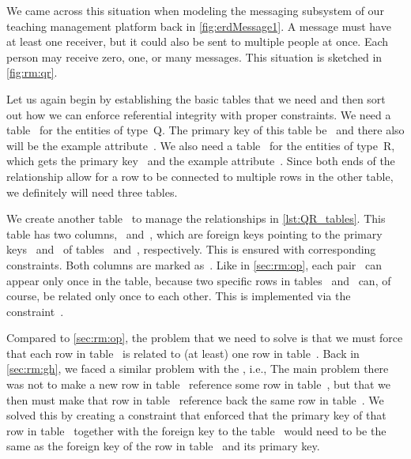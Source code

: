 We came across this situation when modeling the messaging subsystem of our teaching management platform back in \cref{fig:erdMessage1}.
A message must have at least one receiver, but it could also be sent to multiple people at once.
Each person may receive zero, one, or many messages.
This situation is sketched in \cref{fig:rm:qr}.

Let us again begin by establishing the basic tables that we need and then sort out how we can enforce referential integrity with proper constraints.
We need a table~ for the entities of type~Q.
The primary key of this table be~ and there also will be the example attribute~.
We also need a table~ for the entities of type~R, which gets the primary key~ and the example attribute~.
Since both ends of the relationship allow for a row to be connected to multiple rows in the other table, we definitely will need three tables.

We create another table~ to manage the relationships in \cref{lst:QR_tables}.
This table has two columns,~ and~, which are foreign keys pointing to the primary keys~ and~ of tables~ and~, respectively.
This is ensured with corresponding  constraints.
Both columns are marked as~.
Like in \cref{sec:rm:op}, each pair~ can appear only once in the table, because two specific rows in tables~ and~ can, of course, be related only once to each other.
This is implemented via the constraint~.

Compared to \cref{sec:rm:op}, the problem that we need to solve is that we must force that each row in table~ is related to (at least) one row in table~.
Back in \cref{sec:rm:gh}, we faced a similar problem with the , i.e., 
The main problem there was not to make a new row in table~ reference some row in table~, but that we then must make that row in table~ reference back the same row in table~.
We solved this by creating a constraint that enforced that the primary key of that row in table~ together with the foreign key to the table~ would need to be the same as the foreign key of the row in table~ and its primary key.

